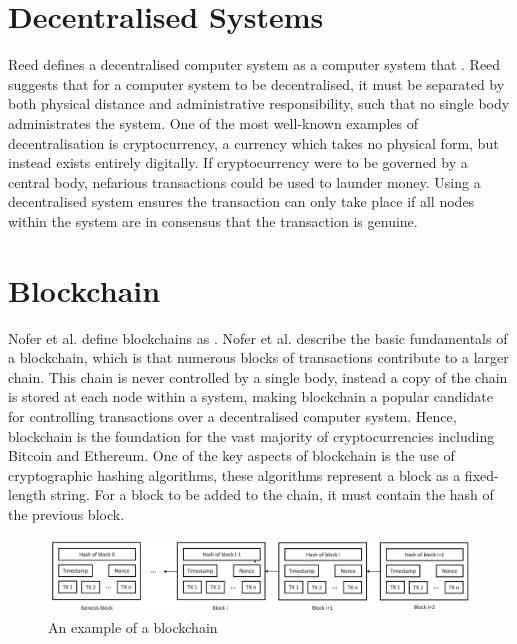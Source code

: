 \documentclass[a4paper, 12pt]{report}
\begin{document}
\section{Decentralised Systems}
Reed defines a decentralised computer system as a computer system that  \cite{namingSyncDec}. Reed suggests that for a computer system to be decentralised, it must be separated by both physical distance and administrative responsibility, such that no single body administrates the system. One of the most well-known examples of decentralisation is \gls{cryptocurrency}, a currency which takes no physical form, but instead exists entirely digitally. If cryptocurrency were to be governed by a central body, nefarious transactions could be used to launder money. Using a decentralised system ensures the transaction can only take place if all nodes within the system are in consensus that the transaction is genuine.

\section{Blockchain}
Nofer et al. define \gls{blockchain}s as  \cite{blockchain}. Nofer et al. describe the basic fundamentals of a \gls{blockchain}, which is that numerous blocks of transactions contribute to a larger chain. This chain is never controlled by a single body, instead a copy of the chain is stored at each node within a system, making \gls{blockchain} a popular candidate for controlling transactions over a decentralised computer system. Hence, \gls{blockchain} is the foundation for the vast majority of cryptocurrencies including Bitcoin\cite{bitcoin} and Ethereum\cite{ethereum}. One of the key aspects of \gls{blockchain} is the use of cryptographic \gls{hashing} algorithms, these algorithms represent a block as a fixed-length string. For a block to be added to the chain, it must contain the hash of the previous block.

\begin{center}
	\begin{figure}[!htb]
		\includegraphics[width=\textwidth,keepaspectratio]{NoferBlock}
		\caption{An example of a \gls{blockchain} \cite{blockchain}} 
		\label{fig:middleware}
	\end{figure}
\end{center}
\end{document}
